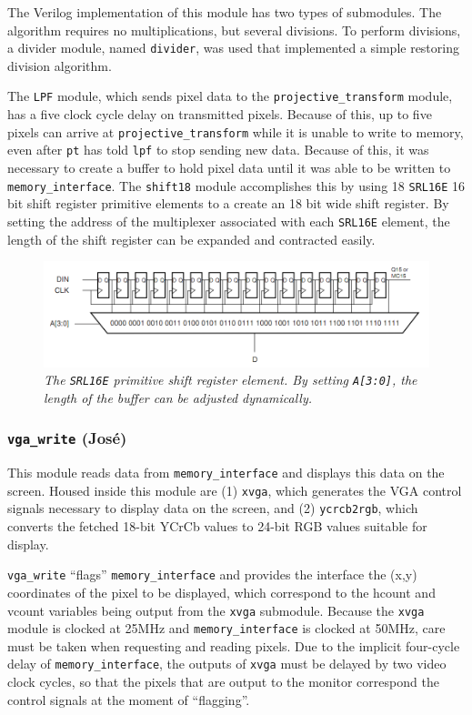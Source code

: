 \documentclass[10pt]{article}
\begin{document}
The Verilog implementation of this module has two types of submodules. The algorithm requires no multiplications, but several divisions. To perform divisions, a divider module, named {\tt divider}, was used that implemented a simple restoring division algorithm. \cite{restoring}

The {\tt LPF} module, which sends pixel data to the {\tt projective\_transform} module, has a five clock cycle delay on transmitted pixels. Because of this, up to five pixels can arrive at {\tt projective\_transform} while it is unable to write to memory, even after {\tt pt} has told {\tt lpf} to stop sending new data. Because of this, it was necessary to create a buffer to hold pixel data until it was able to be written to {\tt memory\_interface}. The {\tt shift18} module accomplishes this by using 18 {\tt SRL16E} 16 bit shift register primitive elements to a create an 18 bit wide shift register. By setting the address of the multiplexer associated with each {\tt SRL16E} element, the length of the shift register can be expanded and contracted easily.

\begin{figure}[h!]
\centering
\includegraphics[width=\textwidth]{images/srl16.png}
\caption{\emph{The {\tt SRL16E} primitive shift register element. By setting {\tt A[3:0]}, the length of the buffer can be adjusted dynamically.}}
\end{figure}

\subsubsection{{\tt vga\_write} (Jos\'{e})}
This module reads data from {\tt memory\_interface} and displays this data on the screen. Housed inside this module are (1) {\tt xvga}, which generates the VGA control signals necessary to display data on the screen, and (2) {\tt ycrcb2rgb}, which converts the fetched 18-bit YCrCb values to 24-bit RGB values suitable for display.

{\tt vga\_write} ``flags'' {\tt memory\_interface} and provides the interface the (x,y) coordinates of the pixel to be displayed, which correspond to the hcount and vcount variables being output from the {\tt xvga} submodule. Because the {\tt xvga} module is clocked at 25MHz and {\tt memory\_interface} is clocked at 50MHz, care must be taken when requesting and reading pixels. Due to the implicit four-cycle delay of {\tt memory\_interface}, the outputs of {\tt xvga} must be delayed by two video clock cycles, so that the pixels that are output to the monitor correspond the control signals at the moment of ``flagging''. 
\end{document}

